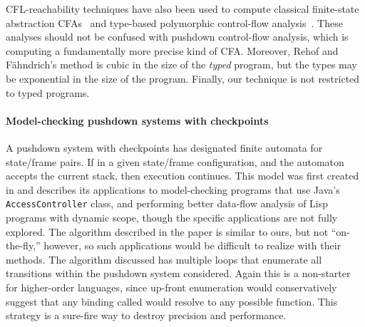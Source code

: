 CFL-reachability techniques have also been used to compute classical
finite-state abstraction CFAs~\cite{mattmight:Melski:2000:CFL} and
type-based polymorphic control-flow
analysis~\cite{mattmight:Rehof:2001:TypeBased}.
These analyses should not be confused with pushdown control-flow
analysis, which is computing a fundamentally more precise kind of CFA.
Moreover, Rehof and F\"ahndrich's method is cubic in the size of the
\emph{typed} program, but the types may be exponential in the size of
the program.
Finally, our technique is not restricted to typed programs.

\paragraph{Model-checking pushdown systems with checkpoints}
A pushdown system with checkpoints has designated finite automata for state/frame pairs.
If in a given state/frame configuration, and the automaton accepts the current stack, then execution continues.
This model was first created in \citet{EsparzaKS03} and describes its applications to model-checking programs that use Java's \texttt{AccessController} class, and performing better data-flow analysis of Lisp programs with dynamic scope, though the specific applications are not fully explored.
The algorithm described in the paper is similar to ours, but not ``on-the-fly,'' however, so such applications would be difficult to realize with their methods.
The algorithm discussed has multiple loops that enumerate all transitions within the pushdown system considered.
Again this is a non-starter for higher-order languages, since up-front enumeration would conservatively suggest that any binding called would resolve to any possible function.
This strategy is a sure-fire way to destroy precision and performance.

